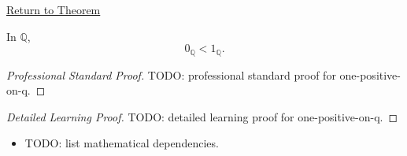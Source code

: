 \newpage
{}
\label{prf:one-positive-on-q}

\begin{remark*}[Return]
\hyperref[cor:one-positive-on-q]{Return to Theorem}
\end{remark*}

\begin{corollary*}
In $\mathbb{Q}$,
\[
0_{\mathbb{Q}}<1_{\mathbb{Q}}.
\]
\end{corollary*}

\begin{proof}[Professional Standard Proof]
\LRAProofBodyStart
TODO: professional standard proof for one-positive-on-q.
\end{proof}

\begin{proof}[Detailed Learning Proof]
\LRAProofBodyStart
TODO: detailed learning proof for one-positive-on-q.
\end{proof}

\begin{remark*}
\end{remark*}

\begin{dependencies}
\begin{itemize}
  \item TODO: list mathematical dependencies.
\end{itemize}
\end{dependencies}

\clearpage
